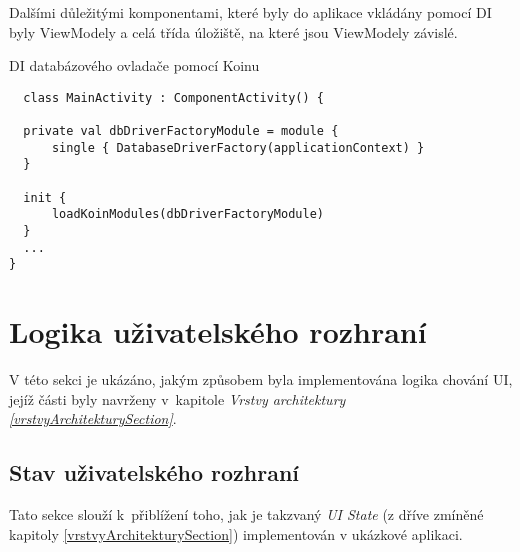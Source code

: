 Dalšími důležitými komponentami, které byly do aplikace vkládány pomocí DI byly ViewModely a celá třída úložiště, na které jsou ViewModely
závislé.

\begin{listing}[H]
\caption{DI databázového ovladače pomocí Koinu}\label{lst:KoinInit}
\begin{verbatim}
  class MainActivity : ComponentActivity() {

  private val dbDriverFactoryModule = module {
      single { DatabaseDriverFactory(applicationContext) }
  }

  init {
      loadKoinModules(dbDriverFactoryModule)
  }
  ...
}
\end{verbatim}
\end{listing}





\section{Logika uživatelského rozhraní} \label{UILayerImpl}
V této sekci je ukázáno, jakým způsobem byla implementována logika chování UI, jejíž části byly navrženy v~kapitole 
\textit{Vrstvy architektury \ref{vrstvyArchitekturySection}}. 



\subsection{Stav uživatelského rozhraní} \label{stateHandlingImpl}
Tato sekce slouží k~přiblížení toho, jak je takzvaný \textit{UI State} (z dříve zmíněné kapitoly \ref{vrstvyArchitekturySection}) 
implementován v ukázkové aplikaci.

